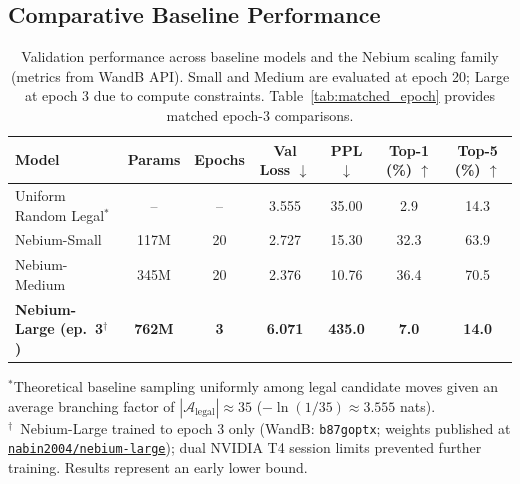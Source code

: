 \subsection{Comparative Baseline Performance}
\label{sec:exp_baselines}

\begin{table}[H]
\centering
\small
\caption[Comparative Baseline and Nebium Family Validation]{Validation performance across baseline models and the Nebium scaling family (metrics from WandB API). Small and Medium are evaluated at epoch 20; Large at epoch 3 due to compute constraints. Table~\ref{tab:matched_epoch} provides matched epoch-3 comparisons.}
\label{tab:baseline_comparison}
\begin{tabularx}{\linewidth}{>{\raggedright\arraybackslash}X c c c c c c}
\toprule
\textbf{Model} & \textbf{Params} & \textbf{Epochs} & \textbf{Val Loss $\downarrow$} & \textbf{PPL $\downarrow$} & \textbf{Top-1 (\%) $\uparrow$} & \textbf{Top-5 (\%) $\uparrow$} \\
\midrule
Uniform Random Legal$^*$ & -- & -- & 3.555 & 35.00 & 2.9 & 14.3 \\
Nebium-Small  & 117M  & 20 & 2.727 & 15.30  & 32.3 & 63.9 \\
Nebium-Medium & 345M  & 20 & 2.376 & 10.76  & 36.4 & 70.5 \\
\textbf{Nebium-Large (ep.\ 3$^\dagger$)} & \textbf{762M} & \textbf{3} & \textbf{6.071} & \textbf{435.0} & \textbf{7.0} & \textbf{14.0} \\
\bottomrule
\end{tabularx}
\vspace{0.3em}
{\footnotesize $^*$Theoretical baseline sampling uniformly among legal candidate moves given an average branching factor of $|\mathcal{A}_{\text{legal}}| \approx 35$ ($-\ln(1/35) \approx 3.555$ nats). \\
$^\dagger$~Nebium-Large trained to epoch 3 only (WandB: \texttt{b87goptx}; weights published at \href{https://huggingface.co/nabin2004/nebium-large}{\texttt{nabin2004/nebium-large}}); dual NVIDIA T4 session limits prevented further training. Results represent an early lower bound.}
\end{table}

